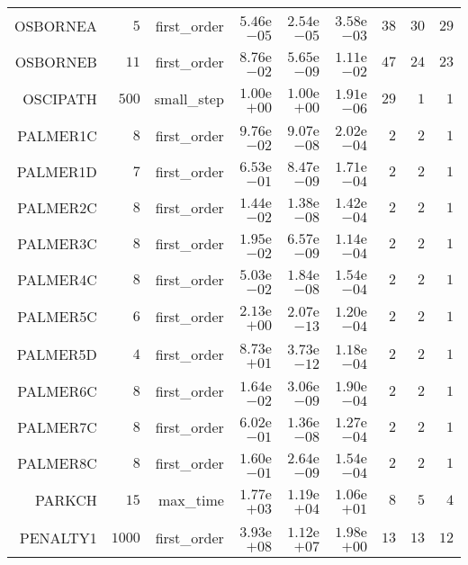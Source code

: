 \begin{longtable}{rrrrrrrrr}
OSBORNEA & \(     5\) & first\_order & \( 5.46\)e\(-05\) & \( 2.54\)e\(-05\) & \( 3.58\)e\(-03\) & \(    38\) & \(    30\) & \(    29\) \\
OSBORNEB & \(    11\) & first\_order & \( 8.76\)e\(-02\) & \( 5.65\)e\(-09\) & \( 1.11\)e\(-02\) & \(    47\) & \(    24\) & \(    23\) \\
OSCIPATH & \(   500\) & small\_step & \( 1.00\)e\(+00\) & \( 1.00\)e\(+00\) & \( 1.91\)e\(-06\) & \(    29\) & \(     1\) & \(     1\) \\
PALMER1C & \(     8\) & first\_order & \( 9.76\)e\(-02\) & \( 9.07\)e\(-08\) & \( 2.02\)e\(-04\) & \(     2\) & \(     2\) & \(     1\) \\
PALMER1D & \(     7\) & first\_order & \( 6.53\)e\(-01\) & \( 8.47\)e\(-09\) & \( 1.71\)e\(-04\) & \(     2\) & \(     2\) & \(     1\) \\
PALMER2C & \(     8\) & first\_order & \( 1.44\)e\(-02\) & \( 1.38\)e\(-08\) & \( 1.42\)e\(-04\) & \(     2\) & \(     2\) & \(     1\) \\
PALMER3C & \(     8\) & first\_order & \( 1.95\)e\(-02\) & \( 6.57\)e\(-09\) & \( 1.14\)e\(-04\) & \(     2\) & \(     2\) & \(     1\) \\
PALMER4C & \(     8\) & first\_order & \( 5.03\)e\(-02\) & \( 1.84\)e\(-08\) & \( 1.54\)e\(-04\) & \(     2\) & \(     2\) & \(     1\) \\
PALMER5C & \(     6\) & first\_order & \( 2.13\)e\(+00\) & \( 2.07\)e\(-13\) & \( 1.20\)e\(-04\) & \(     2\) & \(     2\) & \(     1\) \\
PALMER5D & \(     4\) & first\_order & \( 8.73\)e\(+01\) & \( 3.73\)e\(-12\) & \( 1.18\)e\(-04\) & \(     2\) & \(     2\) & \(     1\) \\
PALMER6C & \(     8\) & first\_order & \( 1.64\)e\(-02\) & \( 3.06\)e\(-09\) & \( 1.90\)e\(-04\) & \(     2\) & \(     2\) & \(     1\) \\
PALMER7C & \(     8\) & first\_order & \( 6.02\)e\(-01\) & \( 1.36\)e\(-08\) & \( 1.27\)e\(-04\) & \(     2\) & \(     2\) & \(     1\) \\
PALMER8C & \(     8\) & first\_order & \( 1.60\)e\(-01\) & \( 2.64\)e\(-09\) & \( 1.54\)e\(-04\) & \(     2\) & \(     2\) & \(     1\) \\
PARKCH & \(    15\) & max\_time & \( 1.77\)e\(+03\) & \( 1.19\)e\(+04\) & \( 1.06\)e\(+01\) & \(     8\) & \(     5\) & \(     4\) \\
PENALTY1 & \(  1000\) & first\_order & \( 3.93\)e\(+08\) & \( 1.12\)e\(+07\) & \( 1.98\)e\(+00\) & \(    13\) & \(    13\) & \(    12\) \\

\end{longtable}
